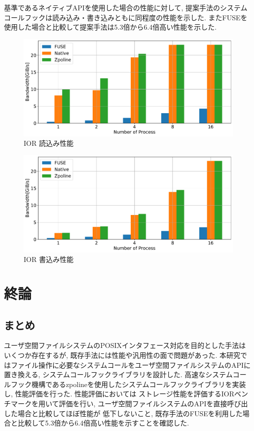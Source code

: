 \documentclass[a4paper,11pt]{jreport}
\begin{document}
基準であるネイティブAPIを使用した場合の性能に対して, 提案手法のシステムコールフックは読み込み・書き込みともに同程度の性能を示した. 
またFUSEを使用した場合と比較して提案手法は5.3倍から6.4倍高い性能を示した. 

\newpage

\begin{figure}[h]
	\begin{minipage}[b]{1\columnwidth}
		\centering
		\includegraphics[width=0.9\linewidth]{./figure/ior_benchmark_read.pdf}
		\caption{IOR 読込み性能}
		\label{fig:Evaluation read}
	\end{minipage}
\end{figure}

\begin{figure}[h]
    \begin{minipage}[b]{1\columnwidth}
		\centering
		\includegraphics[width=0.9\linewidth]{./figure/ior_benchmark_write.pdf}
		\caption{IOR 書込み性能}
		\label{fig:Evaluation write}
	\end{minipage}
\end{figure}

\chapter{終論}
\section{まとめ}
ユーザ空間ファイルシステムのPOSIXインタフェース対応を目的とした手法はいくつか存在するが, 既存手法には性能や汎用性の面で問題があった.
本研究ではファイル操作に必要なシステムコールをユーザ空間ファイルシステムのAPIに置き換える, システムコールフックライブラリを設計した.
高速なシステムコールフック機構であるzpolineを使用したシステムコールフックライブラリを実装し, 性能評価を行った. 性能評価においては
ストレージ性能を評価するIORベンチマークを用いて評価を行い, ユーザ空間ファイルシステムのAPIを直接呼び出した場合と比較してほぼ性能が
低下しないこと, 既存手法のFUSEを利用した場合と比較して5.3倍から6.4倍高い性能を示すことを確認した.
\end{document}
